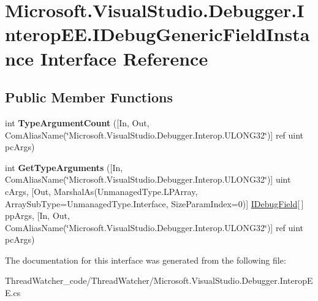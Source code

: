 \hypertarget{interface_microsoft_1_1_visual_studio_1_1_debugger_1_1_interop_e_e_1_1_i_debug_generic_field_instance}{\section{Microsoft.\+Visual\+Studio.\+Debugger.\+Interop\+E\+E.\+I\+Debug\+Generic\+Field\+Instance Interface Reference}
\label{interface_microsoft_1_1_visual_studio_1_1_debugger_1_1_interop_e_e_1_1_i_debug_generic_field_instance}
}
\subsection*{Public Member Functions}
\begin{DoxyCompactItemize}
\item 
\hypertarget{interface_microsoft_1_1_visual_studio_1_1_debugger_1_1_interop_e_e_1_1_i_debug_generic_field_instance_a9ffef9ae0e85136a1078846d1d06cc20}{int {\bfseries Type\+Argument\+Count} (\mbox{[}In, Out, Com\+Alias\+Name(\char`\"{}Microsoft.\+Visual\+Studio.\+Debugger.\+Interop.\+U\+L\+O\+N\+G32\char`\"{})\mbox{]} ref uint pc\+Args)}\label{interface_microsoft_1_1_visual_studio_1_1_debugger_1_1_interop_e_e_1_1_i_debug_generic_field_instance_a9ffef9ae0e85136a1078846d1d06cc20}

\item 
\hypertarget{interface_microsoft_1_1_visual_studio_1_1_debugger_1_1_interop_e_e_1_1_i_debug_generic_field_instance_a25d347dcd1153b7b8ff1c1ad916ddc9f}{int {\bfseries Get\+Type\+Arguments} (\mbox{[}In, Com\+Alias\+Name(\char`\"{}Microsoft.\+Visual\+Studio.\+Debugger.\+Interop.\+U\+L\+O\+N\+G32\char`\"{})\mbox{]} uint c\+Args, \mbox{[}Out, Marshal\+As(Unmanaged\+Type.\+L\+P\+Array, Array\+Sub\+Type=Unmanaged\+Type.\+Interface, Size\+Param\+Index=0)\mbox{]} \hyperlink{interface_microsoft_1_1_visual_studio_1_1_debugger_1_1_interop_e_e_1_1_i_debug_field}{I\+Debug\+Field}\mbox{[}$\,$\mbox{]} pp\+Args, \mbox{[}In, Out, Com\+Alias\+Name(\char`\"{}Microsoft.\+Visual\+Studio.\+Debugger.\+Interop.\+U\+L\+O\+N\+G32\char`\"{})\mbox{]} ref uint pc\+Args)}\label{interface_microsoft_1_1_visual_studio_1_1_debugger_1_1_interop_e_e_1_1_i_debug_generic_field_instance_a25d347dcd1153b7b8ff1c1ad916ddc9f}

\end{DoxyCompactItemize}


The documentation for this interface was generated from the following file\+:\begin{DoxyCompactItemize}
\item 
Thread\+Watcher\+\_\+code/\+Thread\+Watcher/Microsoft.\+Visual\+Studio.\+Debugger.\+Interop\+E\+E.\+cs\end{DoxyCompactItemize}
